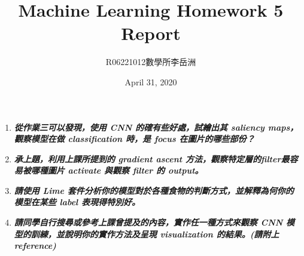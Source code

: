 \documentclass[a4paper,11pt]{article}
\title{Machine Learning Homework 5 Report}
\author{R06221012\hspace{0.2cm}數學所\hspace{0.2cm}李岳洲}
\date{April 31, 2020}
\begin{document}
\maketitle

\begin{enumerate}
	\item \textit{\textbf{從作業三可以發現，使用 CNN 的確有些好處，試繪出其 saliency maps，觀察模型在做 classification 時，是 focus 在圖片的哪些部份？}}

	\item \textit{\textbf{承上題，利用上課所提到的 gradient ascent 方法，觀察特定層的filter最容易被哪種圖片 activate 與觀察 filter 的 output。}}

	\item \textit{\textbf{請使用 Lime 套件分析你的模型對於各種食物的判斷方式，並解釋為何你的模型在某些 label 表現得特別好。}}
	
	\item \textit{\textbf{請同學自行搜尋或參考上課曾提及的內容，實作任一種方式來觀察 CNN 模型的訓練，並說明你的實作方法及呈現 visualization 的結果。(請附上 reference)
}}

\end{enumerate}
\end{document}
